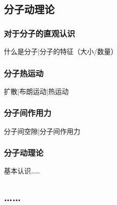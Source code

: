 
\begin{issues}
\issueTODO
\end{issues}


\subsection{分子动理论}
\subsubsection{对于分子的直观认识}
什么是分子|分子的特征（大小/数量）
\subsubsection{分子热运动}
扩散|布朗运动|热运动
\subsubsection{分子间作用力}
分子间空隙|分子间作用力
\subsubsection{分子动理论}
基本认识……

\subsection{……}
